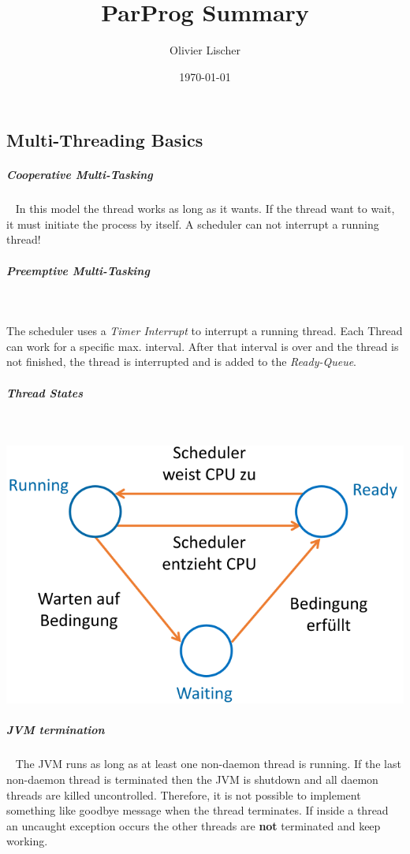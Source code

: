 \documentclass[8pt,twoside,landscape]{extarticle}
\author{Olivier Lischer}
\date{\today}
\title{ParProg Summary}
\begin{document}
\begin{multicols}{5}

\section{Multi-Threading Basics}
\label{sec:orgf797b2f}
\subparagraph{Cooperative Multi-Tasking} \
\label{sec:orgf851e48}
In this model the thread works as long as it wants.
If the thread want to wait, it must initiate the process by itself.
A scheduler can not interrupt a running thread!

\subparagraph{Preemptive Multi-Tasking} \
\label{sec:orgdba0338}

The scheduler uses a \emph{Timer Interrupt} to interrupt a running thread.
Each Thread can work for a specific max. interval.
After that interval is over and the thread is not finished, the thread is interrupted and is added to the \emph{Ready-Queue}.


\subparagraph{Thread States} \
\label{sec:org67b074d}

{
\begin{center}
\includegraphics[width=.9\linewidth]{img/thread_states.png}
\end{center}
\label{fig:thread-states}
}
\subparagraph{JVM termination} \
\label{sec:org1526c34}
The JVM runs as long as at least one non-daemon thread is running.
If the last non-daemon thread is terminated then the JVM is shutdown and all daemon threads are killed uncontrolled.
Therefore, it is not possible to implement something like goodbye message when the thread terminates.
If inside a thread an uncaught exception occurs the other threads are \textbf{not} terminated and keep working.

\end{multicols}
\end{document}
